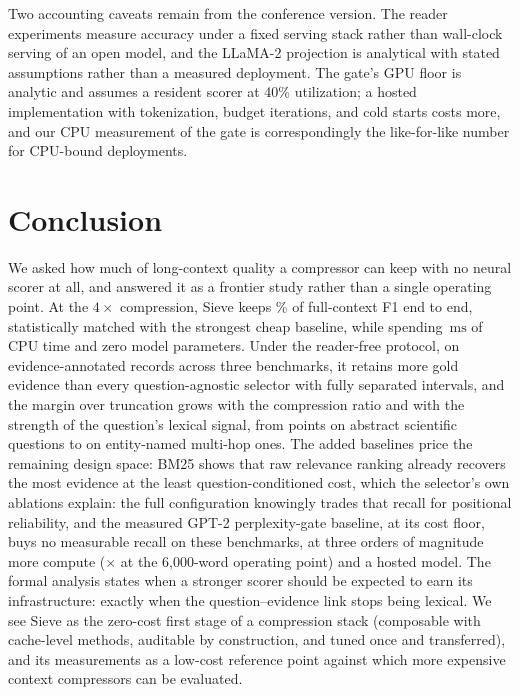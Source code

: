 \documentclass[preprint,12pt]{elsarticle}
\theoremstyle{remark}
\newcommand{\method}{Sieve}
\newcommand{\ms}{\ensuremath{\mathrm{ms}}}
\begin{document}
Two accounting caveats remain from the conference version. The reader
experiments measure accuracy under a fixed serving stack rather than
wall-clock serving of an open model, and the LLaMA-2 projection is
analytical with stated assumptions rather than a measured deployment.
The gate's GPU floor is analytic and assumes a resident scorer at 40\%
utilization; a hosted implementation with tokenization, budget
iterations, and cold starts costs more, and our CPU measurement of
the gate is correspondingly the like-for-like number for CPU-bound
deployments.

\section{Conclusion}
\label{sec:conclusion}
We asked how much of long-context quality a compressor can keep with
no neural scorer at all, and answered it as a frontier study rather
than a single operating point. At the $4\times$ compression,
\method{} keeps \QASieRetain\% of full-context F1 end to end,
statistically matched with the strongest cheap baseline, while
spending \TimeSieSixk\,\ms{} of CPU time and zero model parameters.
Under the reader-free protocol, on \TotalRecords{}
evidence-annotated records across three benchmarks, it retains more
gold evidence than every question-agnostic selector with fully
separated intervals, and the margin over truncation grows with the
compression ratio and with the strength of the question's lexical
signal, from \PairQSH{} points on abstract scientific questions to
\PairHSH{} on entity-named multi-hop ones. The added baselines price
the remaining design space: BM25 shows that raw relevance ranking
already recovers the most evidence at the least
question-conditioned cost, which the selector's own ablations explain:
the full configuration knowingly trades that recall for
positional reliability, and the measured GPT-2 perplexity-gate
baseline, at its cost floor, buys no
measurable recall on these benchmarks, at three orders of magnitude
more compute (\GateSieRatioSixk$\times$ at the 6{,}000-word operating
point) and a hosted model. The formal analysis states when a stronger
scorer should be expected to earn its infrastructure: exactly when the
question--evidence link stops being lexical. We see \method{} as the
zero-cost first stage of a compression stack (composable with
cache-level methods, auditable by construction, and tuned once and
transferred), and its measurements as a low-cost reference point
against which more expensive context compressors can be evaluated.
\end{document}
